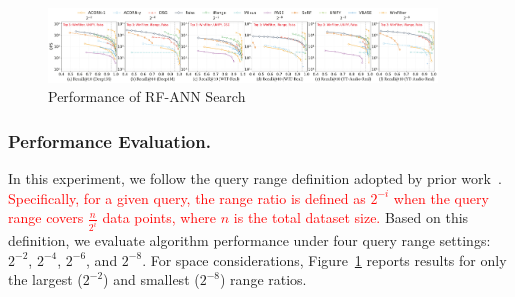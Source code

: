 \documentclass[sigconf, nonacm]{acmart}
\begin{document}
{	



		
	\begin{figure}[t]
		
		\centering
		
		\includegraphics[width=0.92\textwidth]{figures/exp/exp_8_2.pdf}
		\caption{Performance of RF-ANN Search}
		\label{fig:exp_8_2}
	\end{figure}
	
	
	\subsubsection{Performance Evaluation. }
	
	In this experiment, we follow the query range definition adopted by prior work~\cite{HQI}. \textcolor{red}{Specifically, for a given query, the range ratio is defined as $2^{-i}$	when the query range covers $\frac{n}{2^i}$ data points, where $n$ is the total dataset size.}
	Based on this definition, we evaluate algorithm performance under four query range settings: $2^{-2}$, $2^{-4}$, $2^{-6}$, and $2^{-8}$. For space considerations, Figure~\ref{fig:exp_8_2} reports results for only the largest ($2^{-2}$) and smallest ($2^{-8}$) range ratios. 
	
}
\end{document}

